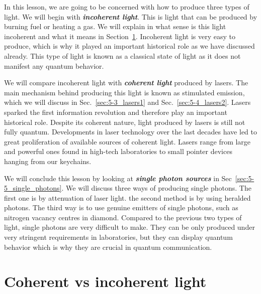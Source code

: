 In this lesson, we are going to be concerned with how to produce three types of light.
We will begin with \textit{\textbf{incoherent light}}.
This is light that can be produced by burning fuel or heating a gas.
We will explain in what sense is this light incoherent and what it means in Section~\ref{sec:5-2_coherent_vs_incoherent}.
Incoherent light is very easy to produce, which is why it played an important historical role as we have discussed already.
This type of light is known as a classical state of light as it does not manifest any quantum behavior.

We will compare incoherent light with \textit{\textbf{coherent light}} produced by lasers. The main mechanism behind producing this light is known as stimulated emission, which we will discuss in Sec.~\ref{sec:5-3_lasers1} and Sec.~\ref{sec:5-4_lasers2}.
Lasers sparked the first information revolution and therefore play an important historical role.
Despite its coherent nature, light produced by lasers is still not fully quantum. 
Developments in laser technology over the last decades have led to great proliferation of available sources of coherent light.
Lasers range from large and powerful ones found in high-tech laboratories to small pointer devices hanging from our keychains.

We will conclude this lesson by looking at \textit{\textbf{single photon sources}} in Sec~\ref{sec:5-5_single_photons}.
We will discuss three ways of producing single photons.
The first one is by attenuation of laser light.
the second method is by using heralded photons.
The third way is to use genuine emitters of single photons, such as nitrogen vacancy centres in diamond.
Compared to the previous two types of light, single photons are very difficult to make.
They can be only produced under very stringent requirements in laboratories, but they can display quantum behavior which is why they are crucial in quantum communication.


\section{Coherent vs incoherent light}
\label{sec:5-2_coherent_vs_incoherent}


